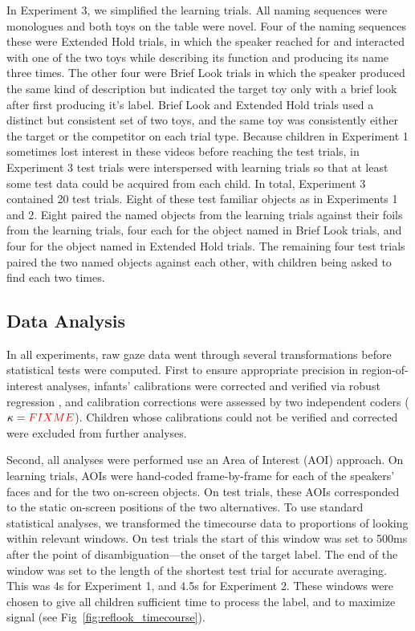 \documentclass{pnastwo}
\newcommand{\red}[1]{\textcolor{red}{#1}}
\begin{document}
\begin{article}
\begin{materials}
In Experiment 3, we simplified the learning trials. All naming sequences were monologues and both toys on the table were novel.  Four of the naming sequences these were Extended Hold trials, in which the speaker reached for and interacted with one of the two toys while describing its function and producing its name three times. The other four were Brief Look trials in which the speaker produced the same kind of description but indicated the target toy only with a brief look after first producing it's label. Brief Look and Extended Hold trials used a distinct but consistent set of two toys, and the same toy was consistently either the target or the competitor on each trial type. Because children in Experiment 1 sometimes lost interest in these videos before reaching the test trials, in Experiment 3 test trials were interspersed with learning trials so that at least some test data could be acquired from each child. In total, Experiment 3 contained 20 test trials. Eight of these test familiar objects as in Experiments 1 and 2. Eight paired the named objects from the learning trials against their foils from the learning trials, four each for the object named in Brief Look trials, and four for the object named in Extended Hold trials. The remaining four test trials paired the two named objects against each other, with children being asked to find each two times.

\subsection{Data Analysis}

In all experiments, raw gaze data went through several transformations before statistical tests were computed. First to ensure appropriate precision in region-of-interest analyses, infants' calibrations were corrected and verified via robust regression \cite[described in][]{frank2012}, and calibration corrections were assessed by two independent coders ($\kappa = \red{FIXME}$). Children whose calibrations could not be verified and corrected were excluded from further analyses.

Second, all analyses were performed use an Area of Interest (AOI) approach. On learning trials, AOIs were hand-coded frame-by-frame for each of the speakers' faces and for the two on-screen objects. On test trials, these AOIs corresponded to the static on-screen positions of the two alternatives. To use standard statistical analyses, we transformed the timecourse data to proportions of looking within relevant windows. On test trials the start of this window was set to 500ms after the point of disambiguation---the onset of the target label. The end of the window was set to the length of the shortest test trial for accurate averaging. This was 4s for Experiment 1, and 4.5s for Experiment 2. These windows were chosen to give all children sufficient time to process the label, and to maximize signal (see Fig~\ref{fig:reflook_timecourse}).


\end{materials}
\end{article}
\end{document}
